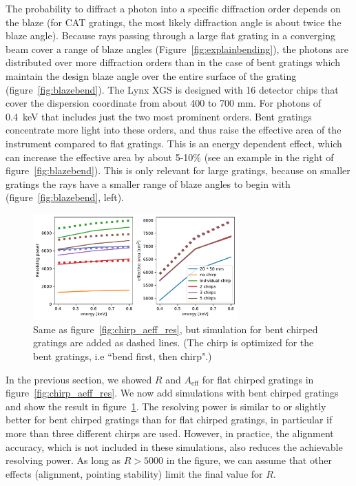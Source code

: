 \documentclass[]{spie}  %
\begin{document}
The probability to diffract a photon into a specific diffraction order depends on the blaze (for CAT gratings, the most likely diffraction angle is about twice the blaze angle). Because rays passing through a large flat grating in a converging beam cover a range of blaze angles (Figure~\ref{fig:explainbending}), the photons are distributed over more diffraction orders than in the case of bent gratings which maintain the design blaze angle over the entire surface of the grating (figure~\ref{fig:blazebend}). The Lynx XGS is designed with 16 detector chips that cover the dispersion coordinate from about 400 to 700 mm. For photons of 0.4~keV that includes just the two most prominent orders. Bent gratings concentrate more light into these orders, and thus raise the effective area of the instrument compared to flat gratings. This is an energy dependent effect, which can increase the effective area by about 5-10\% (see an example in the right of figure~\ref{fig:blazebend}). This is only relevant for large gratings, because on smaller gratings the rays have a smaller range of blaze angles to begin with (figure~\ref{fig:blazebend}, left).

\label{sect:bend}
\begin{figure} [ht]
\begin{center}
\includegraphics[width=0.7\textwidth]{chirp_aeff_res_bend}
\end{center}
\caption {\label{fig:chirp_aeff_res_bend}
Same as figure~\ref{fig:chirp_aeff_res}, but simulation for bent chirped gratings are added as dashed lines.
(The chirp is optimized for the bent gratings, i.e ``bend first, then chirp".)}
\end{figure}
In the previous section, we showed $R$ and $A_{\mathrm{eff}}$ for flat chirped gratings in figure~\ref{fig:chirp_aeff_res}. We now add simulations with bent chirped gratings and show the result in figure~\ref{fig:chirp_aeff_res_bend}. The resolving power is similar to or slightly better for bent chirped gratings than for flat chirped gratings, in particular if more than three different chirps are used. However, in practice, the alignment accuracy, which is not included in these simulations, also reduces the achievable resolving power. As long as $R > 5000$ in the figure, we can assume that other effects (alignment, pointing stability) limit the final value for $R$. 
\end{document}
